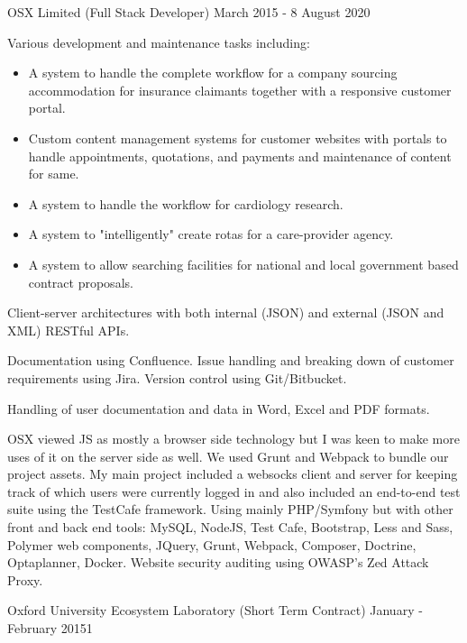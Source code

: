 
\jobHeading
    {OSX Limited (Full Stack Developer)}
    {March 2015 - 8 August 2020}

Various development and maintenance tasks including:
\begin{itemize}
    \item A system to handle the complete workflow for a company sourcing accommodation for insurance claimants together with a responsive customer portal.
    \item Custom content management systems for customer websites with portals to handle appointments, quotations, and payments and maintenance of content for same.
    \item A system to handle the workflow for cardiology research.
    \item A system to "intelligently" create rotas for a care-provider agency.
    \item A system to allow searching facilities for national and local government based contract proposals.
\end{itemize}

Client-server architectures with both
internal (JSON) and external (JSON and XML) RESTful APIs.

Documentation using Confluence. Issue handling and breaking down
of customer requirements using Jira. Version control using Git/Bitbucket.

Handling of user documentation and data in Word, Excel and PDF formats.


\ifnum{}
    OSX viewed JS as mostly a browser side technology
    but I was keen to make more uses of it on the server side as well.
    We used Grunt and Webpack to bundle our project assets.
    My main project included a websocks client and server
    for keeping track of which users were currently logged in
    and also included an end-to-end test suite
    using the TestCafe framework.
\else
    Using mainly PHP/Symfony but with other front and back end tools:
    MySQL, NodeJS, Test Cafe, Bootstrap, Less and Sass,
    Polymer web components, JQuery, Grunt, Webpack, Composer,
    Doctrine, Optaplanner, Docker.
    Website security auditing using OWASP's Zed Attack Proxy.
\fi

\jobHeading
    {Oxford University Ecosystem Laboratory (Short Term Contract)}
    {January - February 20151}

